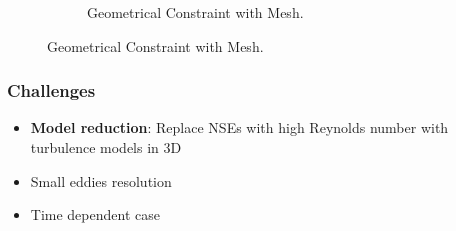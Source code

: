 \documentclass[10pt,xcolor=table,english]{beamer}   %
\begin{document}
\begin{frame}
\begin{figure}
\begin{subfigure}{.49\textwidth}
            \caption{Geometrical Constraint with Mesh.}
        \end{subfigure}
    \end{figure}
\end{frame}

\begin{frame}
    \frametitle{Challenges}
    \begin{itemize}
        \item \textbf{Model reduction}: Replace NSEs with high Reynolds number with turbulence models in 3D 
        \vspace{1cm}
        \item Small eddies resolution
        \vspace{1cm}
        \item Time dependent case
    \end{itemize}
\end{frame}

\end{document}
